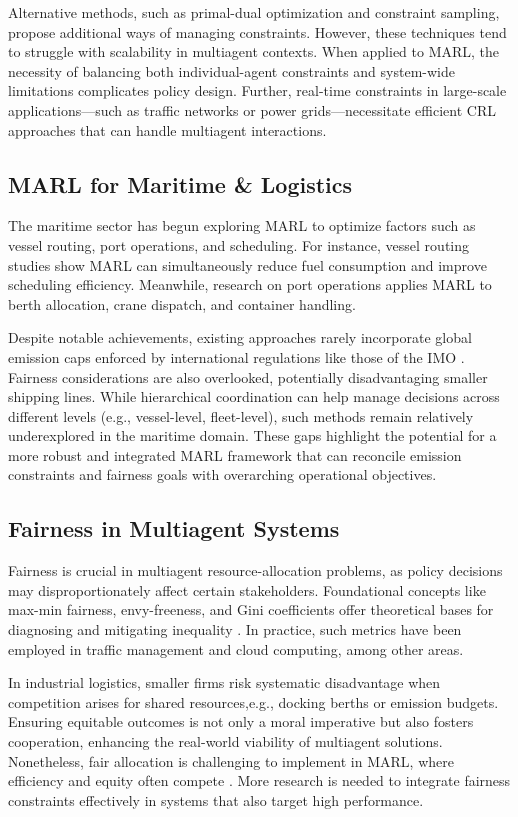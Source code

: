 Alternative methods, such as primal-dual optimization and constraint sampling, propose additional ways of managing constraints. However, these techniques tend to struggle with scalability in multiagent contexts. When applied to MARL, the necessity of balancing both individual-agent constraints and system-wide limitations complicates policy design. Further, real-time constraints in large-scale applications—such as traffic networks or power grids—necessitate efficient CRL approaches that can handle multiagent interactions.

\subsection{MARL for Maritime \& Logistics}
The maritime sector has begun exploring MARL to optimize factors such as vessel routing, port operations, and scheduling. For instance, vessel routing studies show MARL can simultaneously reduce fuel consumption and improve scheduling efficiency. Meanwhile, research on port operations applies MARL to berth allocation, crane dispatch, and container handling.

Despite notable achievements, existing approaches rarely incorporate global emission caps enforced by international regulations like those of the IMO \cite{imo2020}. Fairness considerations are also overlooked, potentially disadvantaging smaller shipping lines. While hierarchical coordination can help manage decisions across different levels (e.g., vessel-level, fleet-level), such methods remain relatively underexplored in the maritime domain. These gaps highlight the potential for a more robust and integrated MARL framework that can reconcile emission constraints and fairness goals with overarching operational objectives.

\subsection{Fairness in Multiagent Systems}
Fairness is crucial in multiagent resource-allocation problems, as policy decisions may disproportionately affect certain stakeholders. Foundational concepts like max-min fairness, envy-freeness, and Gini coefficients offer theoretical bases for diagnosing and mitigating inequality \cite{nash1950bargaining,lipton2004approximately}. In practice, such metrics have been employed in traffic management \cite{aloor2024cooperation} and cloud computing, among other areas.

In industrial logistics, smaller firms risk systematic disadvantage when competition arises for shared resources,e.g., docking berths or emission budgets. Ensuring equitable outcomes is not only a moral imperative but also fosters cooperation, enhancing the real-world viability of multiagent solutions. Nonetheless, fair allocation is challenging to implement in MARL, where efficiency and equity often compete \cite{rawls1971theory}. More research is needed to integrate fairness constraints effectively in systems that also target high performance.

